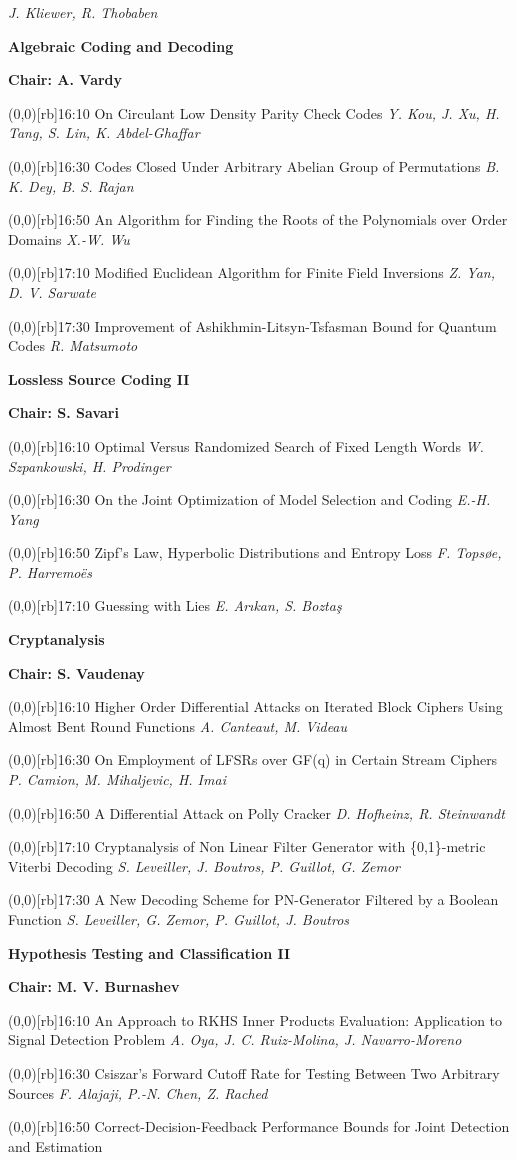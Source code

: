 \documentclass[a5paper,twoside]{article}
\def\sesstitle#1{\vspace{.45\bigskipamount}\par{\bfseries #1}\par}
\def\sesschair#1{{\bfseries Chair: #1}\par\vspace{.65\medskipamount}}
\def\papertime#1{\makebox(0,0)[rb]{{\scriptsize #1}\hspace{.5em}}}
\def\papertitle#1{#1\hfil\break}
\def\paperauthors#1{{\itshape #1}\par\filbreak\vspace{.65\medskipamount}}
\begin{document}
\paperauthors{J. Kliewer, R. Thobaben}
\sesstitle{Algebraic Coding and Decoding}
\sesschair{A. Vardy}
\papertime{16:10}%
\papertitle{On Circulant Low Density Parity Check Codes}
\paperauthors{Y. Kou, J. Xu, H. Tang, S. Lin, K. Abdel-Ghaffar}
\papertime{16:30}%
\papertitle{Codes Closed Under Arbitrary Abelian Group of Permutations}
\paperauthors{B. K. Dey, B. S. Rajan}
\papertime{16:50}%
\papertitle{An Algorithm for Finding the Roots of the Polynomials over Order Domains}
\paperauthors{X.-W. Wu}
\papertime{17:10}%
\papertitle{Modified Euclidean Algorithm for Finite Field Inversions}
\paperauthors{Z. Yan, D. V. Sarwate}
\papertime{17:30}%
\papertitle{Improvement of Ashikhmin-Litsyn-Tsfasman Bound for Quantum Codes}
\paperauthors{R. Matsumoto}
\sesstitle{Lossless Source Coding II}
\sesschair{S. Savari}
\papertime{16:10}%
\papertitle{Optimal Versus Randomized Search of Fixed Length Words}
\paperauthors{W. Szpankowski, H. Prodinger}
\papertime{16:30}%
\papertitle{On the Joint Optimization of Model Selection and Coding}
\paperauthors{E.-H. Yang}
\papertime{16:50}%
\papertitle{Zipf's Law, Hyperbolic Distributions and Entropy Loss}
\paperauthors{F. Tops{\o}e, P. Harremo\"es}
\papertime{17:10}%
\papertitle{Guessing with Lies}
\paperauthors{E. Ar{\i}kan, S. Bozta\c{s}}
\sesstitle{Cryptanalysis}
\sesschair{S. Vaudenay}
\papertime{16:10}%
\papertitle{Higher Order Differential Attacks on Iterated Block Ciphers Using Almost Bent Round Functions}
\paperauthors{A. Canteaut, M. Videau}
\papertime{16:30}%
\papertitle{On Employment of LFSRs over GF(q) in Certain Stream Ciphers}
\paperauthors{P. Camion, M. Mihaljevic, H. Imai}
\papertime{16:50}%
\papertitle{A Differential Attack on Polly Cracker}
\paperauthors{D. Hofheinz, R. Steinwandt}
\papertime{17:10}%
\papertitle{Cryptanalysis of Non Linear Filter Generator with \{0,1\}-metric Viterbi Decoding}
\paperauthors{S. Leveiller, J. Boutros, P. Guillot, G. Zemor}
\papertime{17:30}%
\papertitle{A New Decoding Scheme for PN-Generator Filtered by a Boolean Function}
\paperauthors{S. Leveiller, G. Zemor, P. Guillot, J. Boutros}
\sesstitle{Hypothesis Testing and Classification II}
\sesschair{M. V. Burnashev}
\papertime{16:10}%
\papertitle{An Approach to RKHS Inner Products Evaluation: Application to Signal Detection Problem}
\paperauthors{A. Oya, J. C. Ruiz-Molina, J. Navarro-Moreno}
\papertime{16:30}%
\papertitle{Csiszar's Forward Cutoff Rate for Testing Between Two Arbitrary Sources}
\paperauthors{F. Alajaji, P.-N. Chen, Z. Rached}
\papertime{16:50}%
\papertitle{Correct-Decision-Feedback Performance Bounds for Joint Detection and Estimation}
\end{document}

